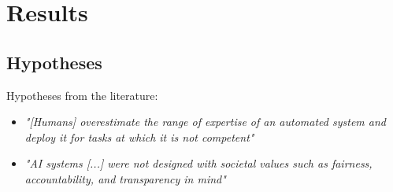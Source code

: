 \section{Results}
\label{sec:results}

\subsection{Hypotheses}

Hypotheses from the literature:

\begin{itemize}
    \item \textit{"[Humans] overestimate the range of expertise of an automated system and deploy it for tasks at which it is not competent"} \citep[p. 19]{akataResearchAgendaHybrid2020}
    \item \textit{"AI systems [...] were not designed with societal values such as fairness, accountability, and transparency in mind"} \citep[p. 19]{akataResearchAgendaHybrid2020}
\end{itemize}


